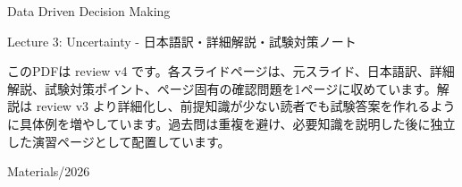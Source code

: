 \documentclass[a4paper,10pt]{article}
\begin{document}
\begin{titlepage}
\centering
\vspace*{2cm}
{\Huge Data Driven Decision Making\par}
\vspace{0.5cm}
{\Large Lecture 3: Uncertainty - 日本語訳・詳細解説・試験対策ノート\par}
\vspace{1cm}
\begin{minipage}{0.88\textwidth}
このPDFは review v4 です。各スライドページは、元スライド、日本語訳、詳細解説、試験対策ポイント、ページ固有の確認問題を1ページに収めています。解説は review v3 より詳細化し、前提知識が少ない読者でも試験答案を作れるように具体例を増やしています。過去問は重複を避け、必要知識を説明した後に独立した演習ページとして配置しています。
\end{minipage}
\vfill
{\large Materials/2026}
\end{titlepage}
\tableofcontents
\clearpage

\end{document}
